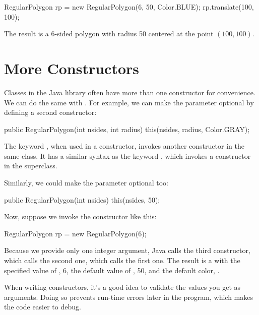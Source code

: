 \begin{code}
RegularPolygon rp = new RegularPolygon(6, 50, Color.BLUE);
rp.translate(100, 100);
\end{code}

The result is a 6-sided polygon with radius 50 centered at the point $(100, 100)$.



\section{More Constructors}

Classes in the Java library often have more than one constructor for convenience.
We can do the same with .
For example, we can make the  parameter optional by defining a second constructor:

\begin{code}
public RegularPolygon(int nsides, int radius) {
    this(nsides, radius, Color.GRAY);
}
\end{code}

The keyword , when used in a constructor, invokes another constructor in the same class.
It has a similar syntax as the keyword , which invokes a constructor in the superclass.

Similarly, we could make the  parameter optional too:

\begin{code}
public RegularPolygon(int nsides) {
    this(nsides, 50);
}
\end{code}

Now, suppose we invoke the  constructor like this:

\begin{code}
RegularPolygon rp = new RegularPolygon(6);
\end{code}

Because we provide only one integer argument, Java calls the third constructor, which calls the second one, which calls the first one.
The result is a  with the specified value of , 6, the default value of , 50, and the default color, .

When writing constructors, it's a good idea to validate the values you get as arguments.
Doing so prevents run-time errors later in the program, which makes the code easier to debug.

